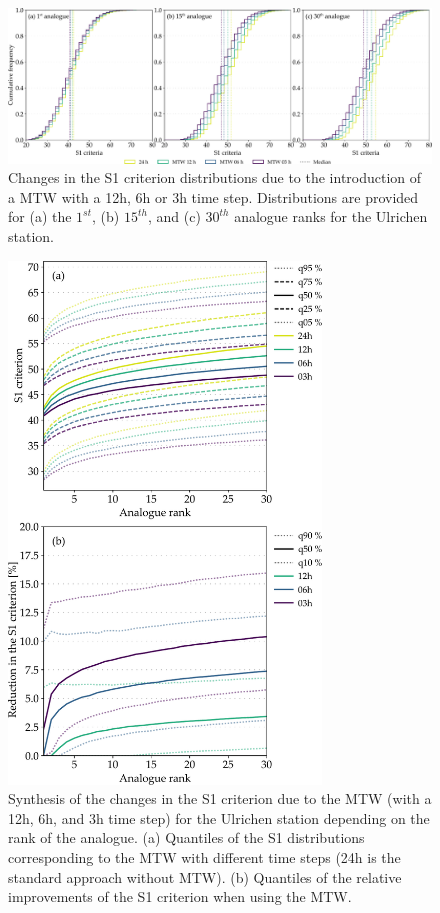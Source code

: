 \documentclass[hess, manuscript]{copernicus}
\begin{document}
	\begin{figure}[htb]
		\begin{center}
			\includegraphics[width=17cm]{fig05.pdf}
		\end{center}
		\caption{Changes in the S1 criterion distributions due to the introduction of a MTW with a 12h, 6h or 3h time step. Distributions are provided for (a) the $1^{st}$, (b) $15^{th}$, and (c) $30^{th}$ analogue ranks for the Ulrichen station.}
		\label{fig:changes_S1_analogs}
	\end{figure}
	
	\begin{figure}[htb]
		\begin{center}
			\includegraphics[width=8.3cm]{fig06.pdf}
		\end{center}
		\caption{Synthesis of the changes in the S1 criterion due to the MTW (with a 12h, 6h, and 3h time step) for the Ulrichen station depending on the rank of the analogue. (a) Quantiles of the S1 distributions corresponding to the MTW with different time steps (24h is the standard approach without MTW). (b) Quantiles of the relative improvements of the S1 criterion when using the MTW.}
		\label{fig:changes_S1}
	\end{figure}
	
\end{document}
